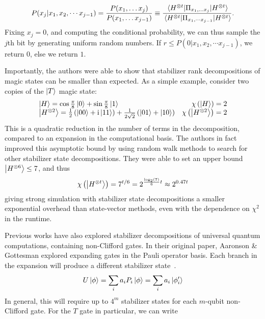 \begin{equation}
    P(x_{j}\vert x_{1},x_{2},\cdots x_{j-1}) = \frac{P(x_{1},\dots x_{j})}{P(x_{1},\dots x_{j-1})} \equiv \frac{\matrixel{H^{\otimes t}}{\Pi_{x_{1},\dots x_{j}}}{H^{\otimes t}}}{\matrixel{H^{\otimes t}}{\Pi_{x_{1},\cdots x_{j-1}}}{H^{\otimes t}}}.
\label{eq:pbc_sampling}
\end{equation}
Fixing $x_{j}=0$, and computing the conditional probability, we can thus sample the $j$th bit by generating uniform random numbers. If $r\leq P(0\vert x_{1},x_{2},\cdots x_{j-1})$, we return $0$, else we return $1$.\par
Importantly, the authors were able to show that stabilizer rank decompositions of magic states can be smaller than expected. As a simple example, consider two copies of the $\ket{T}$ magic state:
\begin{equation}
\begin{array}{l r}
\ket{H} = \cos{\frac{\pi}{8}}\ket{0}+\sin{\frac{\pi}{8}}\ket{1}& \chi\left(\ket{H}\right)=2\\
\ket{H^{\otimes 2}} = \frac{1}{2}\left(\ket{00}+\mathrm{i}\ket{11}\right) + \frac{1}{2\sqrt{2}}\left(\ket{01}+\ket{10}\right) & \chi\left(\ket{H^{\otimes 2}}\right) = 2
\end{array}
\end{equation}
This is a quadratic reduction in the number of terms in the decomposition, compared to an expansion in the computational basis. The authors in fact improved this asymptotic bound by using random walk methods to search for other stabilizer state decompositions. They were able to set an upper bound $\ket{H^{\otimes 6}}\leq 7$, and thus
\begin{equation}
\chi\left(\ket{H^{\otimes t}}\right) = 7^{t/6}=2^{\frac{\log_{2}(7)}{6}t}\approx 2^{0.47 t}
\label{eq:exact_t_state_bound}
\end{equation}
giving strong simulation with stabilizer state decompositions a smaller exponential overhead than state-vector methods, even with the dependence on $\chi^{2}$ in the runtime.\par
Previous works have also explored stabilizer decompositions of universal quantum computations, containing non-Clifford gates. In their original paper, Aaronson \& Gottesman explored expanding gates in the Pauli operator basis. Each branch in the expansion will produce a different stabilizer state~\cite{Aaronson2004}.
\[U\ket{\phi} = \sum_{i}a_{i}P_{i}\ket{\phi} = \sum_{i}a_{i}\ket{\phi'_{i}}\]
In general, this will require up to $4^{m}$ stabilizer states for each $m$-qubit non-Clifford gate. For the $T$ gate in particular, we can write
